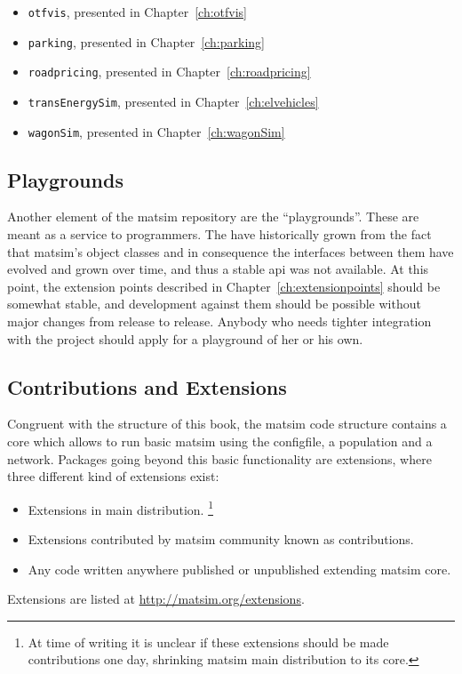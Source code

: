 \begin{itemize}
\item \lstinline{otfvis}, presented in Chapter~\ref{ch:otfvis}
\item \lstinline{parking}, presented in Chapter~\ref{ch:parking}
\item \lstinline{roadpricing}, presented in Chapter~\ref{ch:roadpricing}
\item \lstinline{transEnergySim}, presented in Chapter~\ref{ch:elvehicles}
\item \lstinline{wagonSim}, presented in Chapter~\ref{ch:wagonSim}
\end{itemize}


\subsection{Playgrounds}
Another element of the \gls{matsim} repository are the ``playgrounds''. 
These are meant as a service to programmers. 
The have historically grown from the fact that \gls{matsim}'s object classes and in consequence the interfaces between them have evolved and grown over time, and thus a stable \gls{api} was not available.  
At this point, the extension points described in Chapter~\ref{ch:extensionpoints} should be somewhat stable, and development against them should be possible without major changes from release to release.  
Anybody who needs tighter integration with the project should apply for a playground of her or his own.

\subsection{Contributions and Extensions}
Congruent with the structure of this book, the \gls{matsim} code structure contains a core which allows to run basic \gls{matsim} using the \gls{configfile}, a population and a network. Packages going beyond this basic functionality are \glspl{extension}, where three different kind of extensions exist:
\begin{itemize}\styleItemize 
\item Extensions in main distribution.%
\footnote{At time of writing it is unclear if these extensions should be made \glspl{contribution} one day, shrinking \gls{matsim} main distribution to its core.
}
\item Extensions contributed by \gls{matsim} community known as \glspl{contribution}.
\item Any code written anywhere published or unpublished extending \gls{matsim} core.
\end{itemize}
Extensions are listed at \url{http://matsim.org/extensions}.

